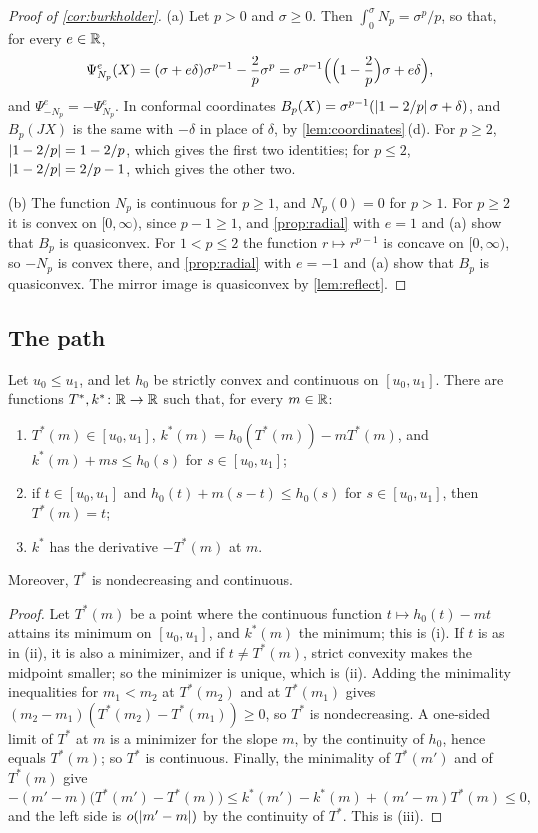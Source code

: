 \begin{proof}[Proof of \cref{cor:burkholder}]
(a) Let $p>0$ and $\sigma\ge0$. Then $\int_0^\sigma N_p=\sigma^p/p$, so that, for every $e\in\mathbb{R}$,
\[
  \Psi^e_{N_p}(X)=(\sigma+e\delta)\sigma^{p-1}-\frac2p\sigma^p
  =\sigma^{p-1}\Bigl(\Bigl(1-\frac2p\Bigr)\sigma+e\delta\Bigr),
\]
and $\Psi^e_{-N_p}=-\Psi^e_{N_p}$. In conformal coordinates
$B_p(X)=\sigma^{p-1}(\lvert 1-2/p\rvert\,\sigma+\delta)$, and $B_p(JX)$ is the same with $-\delta$ in
place of $\delta$, by \cref{lem:coordinates}\,(d). For $p\ge2$, $\lvert 1-2/p\rvert=1-2/p$, which gives
the first two identities; for $p\le2$, $\lvert 1-2/p\rvert=2/p-1$, which gives the other two.

(b) The function $N_p$ is continuous for $p\ge1$, and $N_p(0)=0$ for $p>1$. For $p\ge2$ it is
convex on $[0,\infty)$, since $p-1\ge1$, and \cref{prop:radial} with $e=1$ and (a) show that
$B_p$ is quasiconvex. For $1<p\le2$ the function $r\mapsto r^{p-1}$ is concave on $[0,\infty)$,
so $-N_p$ is convex there, and \cref{prop:radial} with $e=-1$ and (a) show that $B_p$ is
quasiconvex. The mirror image is quasiconvex by \cref{lem:reflect}.
\end{proof}

\subsection{The path}

\begin{lemma}\label{lem:legendre}
Let $u_0\le u_1$, and let $h_0$ be strictly convex and continuous on $[u_0,u_1]$. There are
functions $T^\ast,k^\ast\colon\mathbb{R}\to\mathbb{R}$ such that, for every $m\in\mathbb{R}$:
\begin{enumerate}[label=\textup{(\roman*)}]
\item $T^\ast(m)\in[u_0,u_1]$, $k^\ast(m)=h_0(T^\ast(m))-mT^\ast(m)$, and
  $k^\ast(m)+ms\le h_0(s)$ for $s\in[u_0,u_1]$;
\item if $t\in[u_0,u_1]$ and $h_0(t)+m(s-t)\le h_0(s)$ for $s\in[u_0,u_1]$, then
  $T^\ast(m)=t$;
\item $k^\ast$ has the derivative $-T^\ast(m)$ at $m$.
\end{enumerate}
Moreover, $T^\ast$ is nondecreasing and continuous.
\end{lemma}

\begin{proof}
Let $T^\ast(m)$ be a point where the continuous function $t\mapsto h_0(t)-mt$ attains its
minimum on $[u_0,u_1]$, and $k^\ast(m)$ the minimum; this is (i). If $t$ is as in (ii), it is
also a minimizer, and if $t\ne T^\ast(m)$, strict convexity makes the midpoint smaller; so the
minimizer is unique, which is (ii). Adding the minimality inequalities for $m_1<m_2$ at
$T^\ast(m_2)$ and at $T^\ast(m_1)$ gives $(m_2-m_1)(T^\ast(m_2)-T^\ast(m_1))\ge0$, so
$T^\ast$ is nondecreasing. A one-sided limit of $T^\ast$ at $m$ is a minimizer for the slope
$m$, by the continuity of $h_0$, hence equals $T^\ast(m)$; so $T^\ast$ is continuous. Finally,
the minimality of $T^\ast(m')$ and of $T^\ast(m)$ give
\[
  -(m'-m)\bigl(T^\ast(m')-T^\ast(m)\bigr)\le k^\ast(m')-k^\ast(m)+(m'-m)T^\ast(m)\le0,
\]
and the left side is $o(\lvert m'-m\rvert)$ by the continuity of $T^\ast$. This is (iii).
\end{proof}

